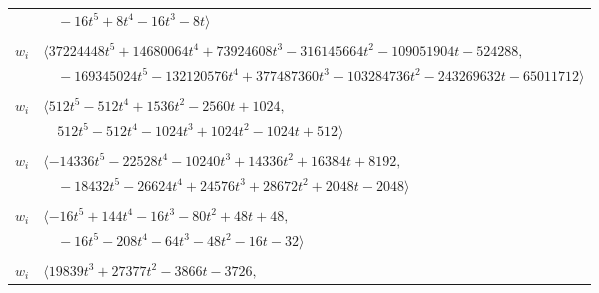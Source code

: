 \documentclass[11pt]{article}
\begin{document}
\begin{longtable}{@{}ll@{}}
 & $\quad -16t^{5}+8t^{4}-16t^{3}-8t\rangle$\\
\addlinespace[2pt]
\multicolumn{2}{@{}p{0.97\textwidth}@{}}{$i=22$, $D_i=262144$, $\rho_{ij}$: $0{:}2, \allowbreak 10{:}2, \allowbreak 14{:}2, \allowbreak 15{:}2, \allowbreak 26{:}1, \allowbreak 44{:}2, \allowbreak 54{:}1, \allowbreak 56{:}1, \allowbreak 59{:}1, \allowbreak 60{:}1, \allowbreak 66{:}1$}\\
$w_i$ & $\langle 37224448t^{5}+14680064t^{4}+73924608t^{3}-316145664t^{2}-109051904t-524288,$\\
 & $\quad -169345024t^{5}-132120576t^{4}+377487360t^{3}-103284736t^{2}-243269632t-65011712\rangle$\\
\addlinespace[2pt]
\multicolumn{2}{@{}p{0.97\textwidth}@{}}{$i=23$, $D_i=512$, $\rho_{ij}$: $7{:}1, \allowbreak 21{:}2, \allowbreak 25{:}2, \allowbreak 32{:}1, \allowbreak 48{:}1, \allowbreak 59{:}1, \allowbreak 65{:}1$}\\
$w_i$ & $\langle 512t^{5}-512t^{4}+1536t^{2}-2560t+1024,$\\
 & $\quad 512t^{5}-512t^{4}-1024t^{3}+1024t^{2}-1024t+512\rangle$\\
\addlinespace[2pt]
\multicolumn{2}{@{}p{0.97\textwidth}@{}}{$i=24$, $D_i=2048$, $\rho_{ij}$: $2{:}2, \allowbreak 5{:}2, \allowbreak 8{:}1, \allowbreak 9{:}1, \allowbreak 25{:}2, \allowbreak 26{:}2, \allowbreak 39{:}1, \allowbreak 58{:}1$}\\
$w_i$ & $\langle -14336t^{5}-22528t^{4}-10240t^{3}+14336t^{2}+16384t+8192,$\\
 & $\quad -18432t^{5}-26624t^{4}+24576t^{3}+28672t^{2}+2048t-2048\rangle$\\
\addlinespace[2pt]
\multicolumn{2}{@{}p{0.97\textwidth}@{}}{$i=25$, $D_i=16$, $\rho_{ij}$: $6{:}2, \allowbreak 9{:}2, \allowbreak 23{:}1, \allowbreak 24{:}1, \allowbreak 32{:}1, \allowbreak 45{:}1, \allowbreak 54{:}1, \allowbreak 58{:}2, \allowbreak 67{:}1$}\\
$w_i$ & $\langle -16t^{5}+144t^{4}-16t^{3}-80t^{2}+48t+48,$\\
 & $\quad -16t^{5}-208t^{4}-64t^{3}-48t^{2}-16t-32\rangle$\\
\addlinespace[2pt]
\multicolumn{2}{@{}p{0.97\textwidth}@{}}{$i=26$, $D_i=512$, $\rho_{ij}$: $4{:}2, \allowbreak 20{:}2, \allowbreak 22{:}2, \allowbreak 24{:}1, \allowbreak 35{:}1, \allowbreak 38{:}1, \allowbreak 39{:}2, \allowbreak 44{:}2, \allowbreak 49{:}2, \allowbreak 59{:}1, \allowbreak 65{:}2$}\\
$w_i$ & $\langle 19839t^{3}+27377t^{2}-3866t-3726,$\\

\end{longtable}
\end{document}
